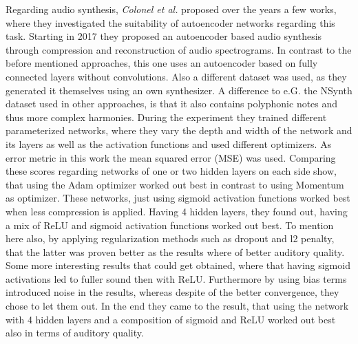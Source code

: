 Regarding audio synthesis, \textit{Colonel et al.} proposed over the years a few works, where they investigated the suitability of autoencoder networks regarding this task. \cite{colonel2017improving, colonel2018autoencoding, Colonel2020} Starting in 2017 they proposed an autoencoder based audio synthesis through compression and reconstruction of audio spectrograms. \cite{colonel2017improving} In contrast to the before mentioned approaches, this one uses an autoencoder based on fully connected layers without convolutions. Also a different dataset was used, as they generated it themselves using an own synthesizer. A difference to e.G. the NSynth dataset used in other approaches, is that it also contains polyphonic notes and thus more complex harmonies. During the experiment they trained different parameterized networks, where they vary the depth and width of the network and its layers as well as the activation functions and used different optimizers. As error metric in this work the mean squared error (MSE) was used. Comparing these scores regarding networks of one or two hidden layers on each side show, that using the Adam optimizer worked out best in contrast to using Momentum as optimizer. These networks, just using sigmoid activation functions worked best when less compression is applied. Having 4 hidden layers, they found out, having a mix of ReLU and sigmoid activation functions worked out best. To mention here also, by applying regularization methods such as dropout and l2 penalty, that the latter was proven better as the results where of better auditory quality. Some more interesting results that could get obtained, where that having sigmoid activations led to fuller sound then with ReLU. Furthermore by using bias terms introduced noise in the results, whereas despite of the better convergence, they chose to let them out. In the end they came to the result, that using the network with 4 hidden layers and a composition of sigmoid and ReLU worked out best also in terms of auditory quality.\\

